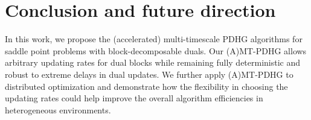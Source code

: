 \documentclass[10pt]{article}
\begin{document}







\section{Conclusion and future direction}\label{sec:conclusion}
In this work, we propose the (accelerated) multi-timescale PDHG algorithms for saddle point problems with block-decomposable duals. Our (A)MT-PDHG allows arbitrary updating rates for dual blocks while remaining fully deterministic and robust to extreme delays in dual updates. We further apply (A)MT-PDHG to distributed optimization and demonstrate how the flexibility in choosing the updating rates could help improve the overall algorithm efficiencies in heterogeneous environments. 
\end{document}
